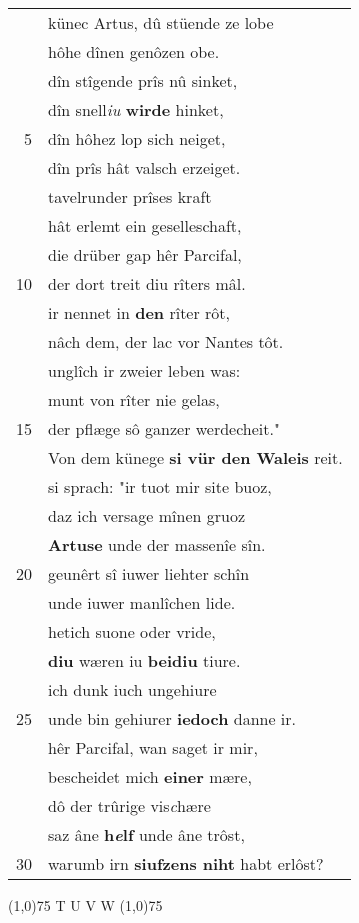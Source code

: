 \documentclass[8pt,a4paper,notitlepage]{article}
\begin{document}
\begin{table}[ht]
\begin{minipage}[t]{0.5\linewidth}
\begin{tabular}{rl}
 & künec Artus, dû stüende ze lobe\\ 
 & hôhe dînen genôzen obe.\\ 
 & dîn stîgende prîs nû sinket,\\ 
 & dîn snell\textit{iu} \textbf{wirde} hinket,\\ 
5 & dîn hôhez lop sich neiget,\\ 
 & dîn prîs hât valsch erzeiget.\\ 
 & tavelrunder prîses kraft\\ 
 & hât erlemt ein geselleschaft,\\ 
 & die drüber gap hêr Parcifal,\\ 
10 & der dort treit diu rîters mâl.\\ 
 & ir nennet in \textbf{den} rîter rôt,\\ 
 & nâch dem, der lac vor Nantes tôt.\\ 
 & unglîch ir zweier leben was:\\ 
 & munt von rîter nie gelas,\\ 
15 & der pflæge sô ganzer werdecheit."\\ 
 & Von dem künege \textbf{si vür den Waleis} reit.\\ 
 & si sprach: "ir tuot mir site buoz,\\ 
 & daz ich versage mînen gruoz\\ 
 & \textbf{Artuse} unde der massenîe sîn.\\ 
20 & geunêrt sî iuwer liehter schîn\\ 
 & unde iuwer manlîchen lide.\\ 
 & hetich suone oder vride,\\ 
 & \textbf{diu} wæren iu \textbf{beidiu} tiure.\\ 
 & ich dunk iuch ungehiure\\ 
25 & unde bin gehiurer \textbf{iedoch} danne ir.\\ 
 & hêr Parcifal, wan saget ir mir,\\ 
 & bescheidet mich \textbf{einer} mære,\\ 
 & dô der trûrige vis\textit{c}hære\\ 
 & saz âne \textbf{h\textit{e}lf} unde âne trôst,\\ 
30 & warumb irn \textbf{siufzens niht} habt erlôst?\\ 
\end{tabular}
\scriptsize
\line(1,0){75} \newline
T U V W \newline
\line(1,0){75} \newline

\end{minipage}
\end{table}
\end{document}
